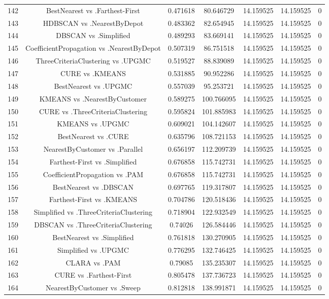 \documentclass[a4paper,10pt]{article}
\begin{document}
\begin{landscape}
\begin{table}[!htp]
\begin{tabular}{ccccccc}
142&BestNearest vs .Farthest-First&0.471618&80.646729&14.159525&14.159525&0\\
143&HDBSCAN vs .NearestByDepot&0.483362&82.654945&14.159525&14.159525&0\\
144&DBSCAN vs .Simplified&0.489293&83.669141&14.159525&14.159525&0\\
145&CoefficientPropagation vs .NearestByDepot&0.507319&86.751518&14.159525&14.159525&0\\
146&ThreeCriteriaClustering vs .UPGMC&0.519527&88.839089&14.159525&14.159525&0\\
147&CURE vs .KMEANS&0.531885&90.952286&14.159525&14.159525&0\\
148&BestNearest vs .UPGMC&0.557039&95.253721&14.159525&14.159525&0\\
149&KMEANS vs .NearestByCustomer&0.589275&100.766095&14.159525&14.159525&0\\
150&CURE vs .ThreeCriteriaClustering&0.595824&101.885983&14.159525&14.159525&0\\
151&KMEANS vs .UPGMC&0.609021&104.142607&14.159525&14.159525&0\\
152&BestNearest vs .CURE&0.635796&108.721153&14.159525&14.159525&0\\
153&NearestByCustomer vs .Parallel&0.656197&112.209739&14.159525&14.159525&0\\
154&Farthest-First vs .Simplified&0.676858&115.742731&14.159525&14.159525&0\\
155&CoefficientPropagation vs .PAM&0.676858&115.742731&14.159525&14.159525&0\\
156&BestNearest vs .DBSCAN&0.697765&119.317807&14.159525&14.159525&0\\
157&Farthest-First vs .KMEANS&0.704786&120.518436&14.159525&14.159525&0\\
158&Simplified vs .ThreeCriteriaClustering&0.718904&122.932549&14.159525&14.159525&0\\
159&DBSCAN vs .ThreeCriteriaClustering&0.74026&126.584446&14.159525&14.159525&0\\
160&BestNearest vs .Simplified&0.761818&130.270905&14.159525&14.159525&0\\
161&Simplified vs .UPGMC&0.776295&132.746425&14.159525&14.159525&0\\
162&CLARA vs .PAM&0.79085&135.235307&14.159525&14.159525&0\\
163&CURE vs .Farthest-First&0.805478&137.736723&14.159525&14.159525&0\\
164&NearestByCustomer vs .Sweep&0.812818&138.991871&14.159525&14.159525&0\\

\end{tabular}
\end{table}
\end{landscape}
\end{document}

